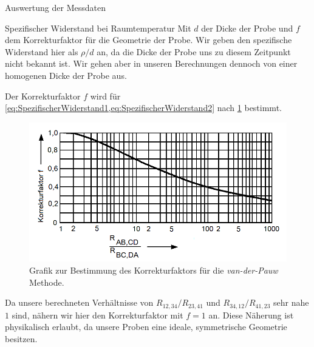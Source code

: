 \documentclass[pdftex, a4paper,11pt, twoside, ngerman]{report}
\begin{document}
\begin{chapter}{Auswertung der Messdaten}
\begin{section}{Spezifischer Widerstand bei Raumtemperatur}
      Mit $d$ der Dicke der Probe und $f$ dem Korrekturfaktor für die Geometrie
      der Probe.
      Wir geben den spezifische Widerstand hier als $\rho/d$ an, da die Dicke
      der Probe uns zu diesem Zeitpunkt nicht bekannt ist.
      Wir gehen aber in unseren Berechnungen dennoch von einer homogenen Dicke
      der Probe aus.
      
      Der Korrekturfaktor $f$ wird für
      \cref{eq:SpezifischerWiderstand1,eq:SpezifischerWiderstand2} nach
      \cref{fig:Korrekturfaktor} bestimmt.
      \begin{figure}[htbp]
        \centering
        \includegraphics[width=\textwidth]{Figures/Korrekturfaktor.png}
        \caption{Grafik zur Bestimmung des Korrekturfaktors für die
            \textit{van-der-Pauw} Methode.\cite{bib:Anleitung}}
        \label{fig:Korrekturfaktor}
      \end{figure}
      
      Da unsere berechneten Verhältnisse von $R_{12,34}/R_{23,41}$ und
      $R_{34,12}/R_{41,23}$ sehr nahe $1$ sind, nähern wir hier den
      Korrekturfaktor mit $f=1$ an.
      Diese Näherung ist physikalisch erlaubt, da unsere Proben eine ideale,
      symmetrische Geometrie besitzen.
      

\end{section}
\end{chapter}
\end{document}
